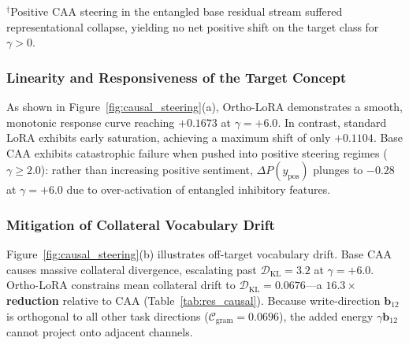 \documentclass[10pt,twocolumn,letterpaper]{article}
\begin{document}
\begin{table}[htbp]
    \centering
    \small
    \caption{\textbf{Causal Steering Benchmark.} Evaluated on \texttt{Qwen-2.5-0.5B} ($r=32$, Layer 12) across $\gamma \in [-6, +6]$. Ortho-LoRA achieves the highest peak selectivity ($\text{SSI} = 3.837$), delivering $51.5\%$ higher target probability shift than standard LoRA while suppressing collateral drift.}
    \label{tab:res_causal}
    \begin{flushleft}
    \scriptsize{$^\dagger$Positive CAA steering in the entangled base residual stream suffered representational collapse, yielding no net positive shift on the target class for $\gamma > 0$.}
    \end{flushleft}
\end{table}

\subsubsection{Linearity and Responsiveness of the Target Concept}
As shown in Figure~\ref{fig:causal_steering}(a), Ortho-LoRA demonstrates a smooth, monotonic response curve reaching $+0.1673$ at $\gamma=+6.0$. In contrast, standard LoRA exhibits early saturation, achieving a maximum shift of only $+0.1104$. Base CAA exhibits catastrophic failure when pushed into positive steering regimes ($\gamma \ge 2.0$): rather than increasing positive sentiment, $\Delta P(y_{\text{pos}})$ plunges to $-0.28$ at $\gamma=+6.0$ due to over-activation of entangled inhibitory features.

\subsubsection{Mitigation of Collateral Vocabulary Drift}
Figure~\ref{fig:causal_steering}(b) illustrates off-target vocabulary drift. Base CAA causes massive collateral divergence, escalating past $\mathcal{D}_{\text{KL}} = 3.2$ at $\gamma = +6.0$. Ortho-LoRA constrains mean collateral drift to $\mathcal{D}_{\text{KL}} = 0.0676$---a \textbf{$16.3\times$ reduction} relative to CAA (Table~\ref{tab:res_causal}). Because write-direction $\bm{b}_{12}$ is orthogonal to all other task directions ($\mathcal{C}_{\text{gram}} = 0.0696$), the added energy $\gamma \bm{b}_{12}$ cannot project onto adjacent channels.
\end{document}
